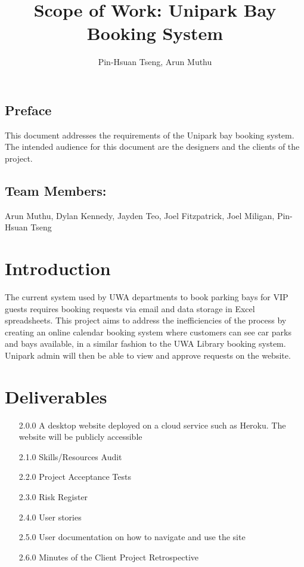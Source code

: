\documentclass[a4paper, draft]{article}
\author{Pin-Hsuan Tseng, Arun Muthu}
\title{Scope of Work: Unipark Bay Booking System}
\begin{document}
\setcounter{secnumdepth}{2}

\maketitle

\subsection*{Preface}
This document addresses the requirements of the Unipark bay booking system.
The intended audience for this document are the designers and the clients of the project.

\subsection*{Team Members:}
Arun Muthu, Dylan Kennedy, Jayden Teo, Joel Fitzpatrick, Joel Miligan, Pin-Hsuan Tseng

\section{Introduction}
The current system used by UWA departments to book parking bays for
VIP guests requires booking requests via email and data storage in
Excel spreadsheets. This project aims to address the inefficiencies
of the process by creating an online calendar booking system where
customers can see car parks and bays available, in a similar fashion
to the UWA Library booking system. Unipark admin will then be able
to view and approve requests on the website.

\section{Deliverables}
\begin{itemize}
    \item [2.0.0] A desktop website deployed on a cloud service such as Heroku.
          The website will be publicly accessible
    \item [2.1.0] Skills/Resources Audit
    \item [2.2.0] Project Acceptance Tests
    \item [2.3.0] Risk Register
    \item [2.4.0] User stories
    \item [2.5.0] User documentation on how to navigate and use the site
    \item [2.6.0] Minutes of the Client Project Retrospective
\end{itemize}
\end{document}
